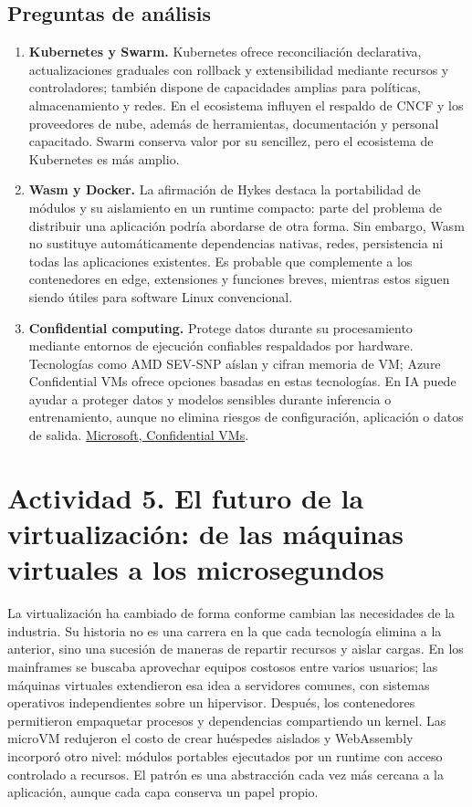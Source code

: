 \subsection{Preguntas de análisis}
\begin{enumerate}
\item \textbf{Kubernetes y Swarm.} Kubernetes ofrece reconciliación declarativa, actualizaciones graduales con rollback y extensibilidad mediante recursos y controladores; también dispone de capacidades amplias para políticas, almacenamiento y redes. En el ecosistema influyen el respaldo de CNCF y los proveedores de nube, además de herramientas, documentación y personal capacitado. Swarm conserva valor por su sencillez, pero el ecosistema de Kubernetes es más amplio.
\item \textbf{Wasm y Docker.} La afirmación de Hykes destaca la portabilidad de módulos y su aislamiento en un runtime compacto: parte del problema de distribuir una aplicación podría abordarse de otra forma. Sin embargo, Wasm no sustituye automáticamente dependencias nativas, redes, persistencia ni todas las aplicaciones existentes. Es probable que complemente a los contenedores en edge, extensiones y funciones breves, mientras estos siguen siendo útiles para software Linux convencional.
\item \textbf{Confidential computing.} Protege datos durante su procesamiento mediante entornos de ejecución confiables respaldados por hardware. Tecnologías como AMD SEV-SNP aíslan y cifran memoria de VM; Azure Confidential VMs ofrece opciones basadas en estas tecnologías. En IA puede ayudar a proteger datos y modelos sensibles durante inferencia o entrenamiento, aunque no elimina riesgos de configuración, aplicación o datos de salida. \href{https://learn.microsoft.com/en-us/azure/confidential-computing/confidential-vm-overview}{Microsoft, Confidential VMs}.
\end{enumerate}

\section{Actividad 5. El futuro de la virtualización: de las máquinas virtuales a los microsegundos}

La virtualización ha cambiado de forma conforme cambian las necesidades de la industria. Su historia no es una carrera en la que cada tecnología elimina a la anterior, sino una sucesión de maneras de repartir recursos y aislar cargas. En los mainframes se buscaba aprovechar equipos costosos entre varios usuarios; las máquinas virtuales extendieron esa idea a servidores comunes, con sistemas operativos independientes sobre un hipervisor. Después, los contenedores permitieron empaquetar procesos y dependencias compartiendo un kernel. Las microVM redujeron el costo de crear huéspedes aislados y WebAssembly incorporó otro nivel: módulos portables ejecutados por un runtime con acceso controlado a recursos. El patrón es una abstracción cada vez más cercana a la aplicación, aunque cada capa conserva un papel propio.

